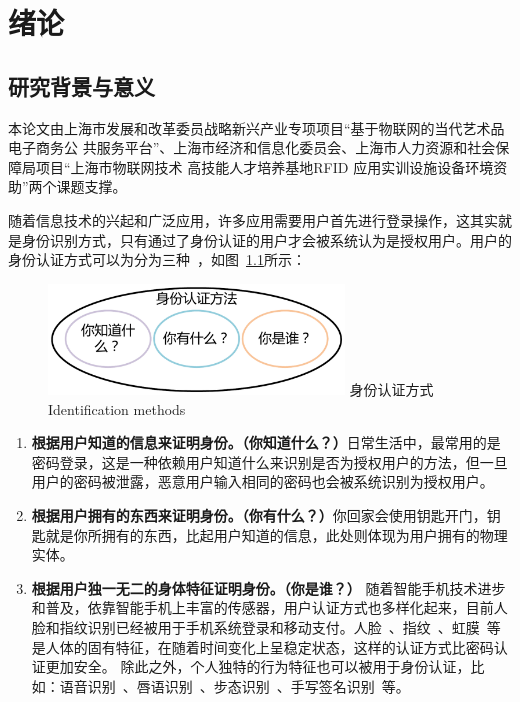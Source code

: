 
\chapter{绪论}
\label{chap:intro}
\section{研究背景与意义}
本论文由上海市发展和改革委员战略新兴产业专项项目“基于物联网的当代艺术品电子商务公
共服务平台”、上海市经济和信息化委员会、上海市人力资源和社会保障局项目“上海市物联网技术
高技能人才培养基地RFID 应用实训设施设备环境资助”两个课题支撑。


随着信息技术的兴起和广泛应用，许多应用需要用户首先进行登录操作，这其实就是身份识别方式，只有通过了身份认证的用户才会被系统认为是授权用户。用户的身份认证方式可以为分为三种~\cite{Huang2011A}，如图~\ref{fig:identification-method}所示：
\begin{figure}[!htp]
  \centering
  \includegraphics[width=0.7\textwidth]{figure/identification-method.pdf}
  \bicaption
    {身份认证方式}
    {Identification methods}
  \label{fig:identification-method}
\end{figure}
\begin{enumerate}[label=(\arabic*),leftmargin=*]
    \item \textbf{根据用户知道的信息来证明身份。（你知道什么？）}日常生活中，最常用的是密码登录，这是一种依赖用户知道什么来识别是否为授权用户的方法，但一旦用户的密码被泄露，恶意用户输入相同的密码也会被系统识别为授权用户。
    \item \textbf{根据用户拥有的东西来证明身份。（你有什么？）}你回家会使用钥匙开门，钥匙就是你所拥有的东西，比起用户知道的信息，此处则体现为用户拥有的物理实体。
    \item \textbf{根据用户独一无二的身体特征证明身份。（你是谁？）} 随着智能手机技术进步和普及，依靠智能手机上丰富的传感器，用户认证方式也多样化起来，目前人脸和指纹识别已经被用于手机系统登录和移动支付。人脸~\cite{12717}、指纹~\cite{Andrew2005Handbook}、虹膜~\cite{Wildes1997Iris}等是人体的固有特征，在随着时间变化上呈稳定状态，这样的认证方式比密码认证更加安全。 除此之外，个人独特的行为特征也可以被用于身份认证，比如：语音识别~\cite{Rashid2008Security}、唇语识别~\cite{Cetingul2006Discriminative}、步态识别~\cite{Boulgouris2005Gait}、手写签名识别~\cite{Plamondona1989Automatic}等。 
\end{enumerate}

